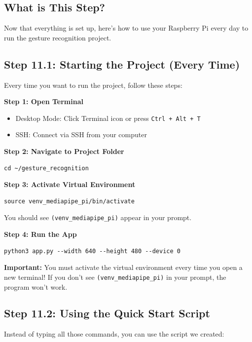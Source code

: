 \documentclass[12pt,a4paper]{article}
\begin{document}
\subsection{What is This Step?}

Now that everything is set up, here's how to use your Raspberry Pi every day to run the gesture recognition project.

\subsection{Step 11.1: Starting the Project (Every Time)}

Every time you want to run the project, follow these steps:

\textbf{Step 1: Open Terminal}
\begin{itemize}
    \item Desktop Mode: Click Terminal icon or press \texttt{Ctrl + Alt + T}
    \item SSH: Connect via SSH from your computer
\end{itemize}

\textbf{Step 2: Navigate to Project Folder}
\begin{lstlisting}
cd ~/gesture_recognition
\end{lstlisting}

\textbf{Step 3: Activate Virtual Environment}
\begin{lstlisting}
source venv_mediapipe_pi/bin/activate
\end{lstlisting}

You should see \texttt{(venv\_mediapipe\_pi)} appear in your prompt.

\textbf{Step 4: Run the App}
\begin{lstlisting}
python3 app.py --width 640 --height 480 --device 0
\end{lstlisting}

\begin{warningbox}
\textbf{Important:} You must activate the virtual environment every time you open a new terminal! If you don't see \texttt{(venv\_mediapipe\_pi)} in your prompt, the program won't work.
\end{warningbox}

\subsection{Step 11.2: Using the Quick Start Script}

Instead of typing all those commands, you can use the script we created:
\end{document}
